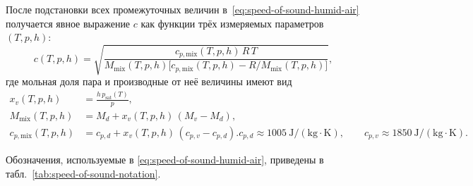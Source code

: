 \documentclass[a4paper,11pt]{article} %
\begin{document}
После подстановки всех промежуточных величин в~\eqref{eq:speed-of-sound-humid-air} получается явное
выражение $c$ как функции трёх измеряемых параметров $(T, p, h)$:
\begin{equation}\label{eq:speed-of-sound-explicit}
  c(T,p,h) = \sqrt{\frac{c_{p,\mathrm{mix}}(T,p,h)\,R\,T}
                        {M_{\mathrm{mix}}(T,p,h)\bigl[c_{p,\mathrm{mix}}(T,p,h) - R/M_{\mathrm{mix}}(T,p,h)\bigr]}},
\end{equation}
где мольная доля пара и производные от неё величины имеют вид
\begin{align*}
  x_v(T,p,h)            &= \frac{h\,p_{\mathrm{sat}}(T)}{p}, \\
  M_{\mathrm{mix}}(T,p,h) &= M_d + x_v(T,p,h)\,(M_v - M_d), \\
  c_{p,\mathrm{mix}}(T,p,h) &= c_{p,d} + x_v(T,p,h)\,(c_{p,v} - c_{p,d}).
  c_{p,d} \approx 1005~\mathrm{J/(kg\cdot K)},\qquad
  c_{p,v} \approx 1850~\mathrm{J/(kg\cdot K)}.
\end{align*}

Обозначения, используемые в \eqref{eq:speed-of-sound-humid-air}, приведены в табл.~\ref{tab:speed-of-sound-notation}.
\end{document}
